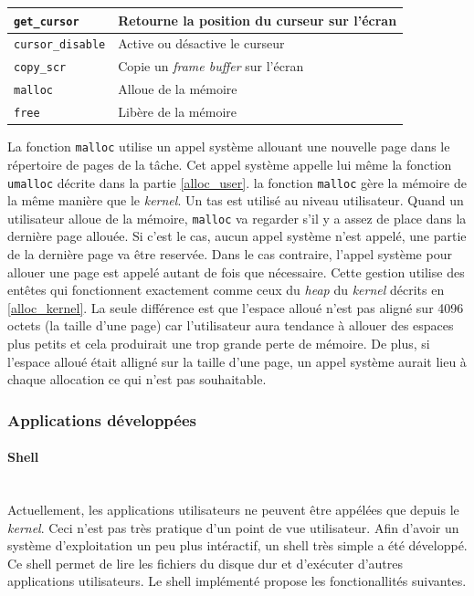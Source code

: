 \begin{center}
{\begin{tabular}{| l | l |}
            \texttt{get_cursor} & Retourne la position du curseur sur
            l'écran \\ \hline
            \texttt{cursor_disable} & Active ou désactive le curseur \\ \hline
            \texttt{copy_scr} & Copie un \textit{frame buffer} sur
            l'écran \\ \hline
            \texttt{malloc} & Alloue de la mémoire \\ \hline
            \texttt{free} & Libère de la mémoire \\ \hline
		\end{tabular}
	}
    \label{tab:tasks:ulibc}
\end{center}

La fonction \texttt{malloc} utilise un appel système allouant une nouvelle
page dans le répertoire de pages de la tâche. Cet appel système appelle lui même
la fonction \texttt{umalloc} décrite dans la partie \ref{alloc_user}.
la fonction \texttt{malloc} gère la mémoire de la même manière que le
\textit{kernel}. Un tas est utilisé au niveau utilisateur. Quand un utilisateur
alloue de la mémoire, \texttt{malloc} va regarder s'il y a assez de
place dans la dernière page allouée. Si c'est le cas, aucun appel système n'est
appelé, une partie de la dernière page va être reservée. Dans le cas contraire,
l'appel système pour allouer une page est appelé autant de fois que nécessaire.
Cette gestion utilise des entêtes qui fonctionnent exactement comme ceux du
\textit{heap} du \textit{kernel} décrits en \ref{alloc_kernel}. La seule différence
est que l'espace alloué n'est pas aligné sur 4096 octets (la taille d'une page)
car l'utilisateur aura tendance à allouer des espaces plus petits et cela produirait
une trop grande perte de mémoire. De plus, si l'espace alloué était alligné sur
la taille d'une page, un appel système aurait lieu à chaque allocation ce qui n'est
pas souhaitable.

\subsubsection{Applications développées}
\paragraph{Shell} \mbox{} \\
Actuellement, les applications utilisateurs ne peuvent être appélées que depuis
le \textit{kernel}. Ceci n'est pas très pratique d'un point de vue utilisateur.
Afin d'avoir un système d'exploitation un peu plus intéractif, un shell très
simple a été développé. Ce shell permet de lire les fichiers du disque dur et
d'exécuter d'autres applications utilisateurs. Le shell implémenté propose
les fonctionallités suivantes.


